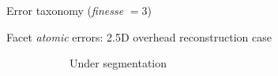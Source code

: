 \documentclass[10pt, export]{beamer}
\begin{document}
        \begin{frame}{Error taxonomy (\textit{finesse} $= 3$)}
            \begin{figure}
                
            \end{figure}
        \end{frame}
        \begin{frame}{Facet \textit{atomic} errors: 2.5D overhead reconstruction case}
            \begin{figure}
                \begin{center}
                    \begin{subfigure}{.28\textwidth}
                        \caption{\label{fig::fac_under} Under segmentation}
                    \end{subfigure}
                    \hspace{10pt}
                    \begin{subfigure}{.28\textwidth}

\end{subfigure}
\end{center}
\end{figure}
\end{frame}
\end{document}
